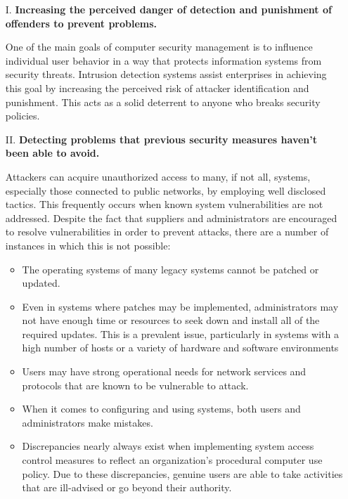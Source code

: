 \documentclass[12pt]{article}
\begin{document}
    \begin{enumerate}
        \item[I.] \textbf{Increasing the perceived danger of detection and punishment of offenders to prevent problems.}
        \par One of the main goals of computer security management is to influence individual user behavior in a way that protects information systems from security threats. Intrusion detection systems assist enterprises in achieving this goal by increasing the perceived risk of attacker identification and punishment. This acts as a solid deterrent to anyone who breaks security policies.
        \\
        \item[II.] \textbf{Detecting problems that previous security measures haven't been able to avoid.}
        \par Attackers can acquire unauthorized access to many, if not all, systems, especially those connected to public networks, by employing well disclosed tactics. This frequently occurs when known system vulnerabilities are not addressed. Despite the fact that suppliers and administrators are encouraged to resolve vulnerabilities in order to prevent attacks, there are a number of instances in which this is not possible:
        \begin{itemize}
            \item The operating systems of many legacy systems cannot be patched or updated.
            \item Even in systems where patches may be implemented, administrators may not have enough time or resources to seek down and install all of the required updates. This is a prevalent issue, particularly in systems with a high number of hosts or a variety of hardware and software environments
            \item Users may have strong operational needs for network services and protocols that are known to be vulnerable to attack.
            \item When it comes to configuring and using systems, both users and administrators make mistakes.
            \item Discrepancies nearly always exist when implementing system access control measures to reflect an organization's procedural computer use policy. Due to these discrepancies, genuine users are able to take activities that are ill-advised or go beyond their authority.
        \end{itemize}
        

\end{enumerate}
\end{document}

